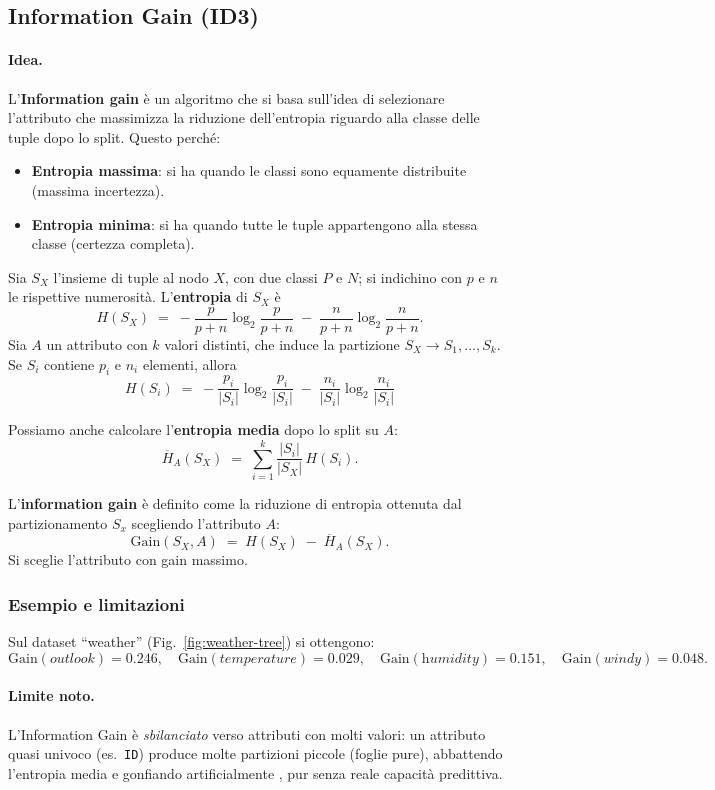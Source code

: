 \subsection{Information Gain (ID3)}\label{subsec:ig}
\paragraph{Idea.} L'\textbf{Information gain} è un algoritmo che si basa sull'idea di selezionare l'attributo che massimizza la riduzione dell'entropia riguardo alla classe delle tuple dopo lo split. Questo perché:
\begin{itemize}
  \item \textbf{Entropia massima}: si ha quando le classi sono equamente distribuite (massima incertezza).
  \item \textbf{Entropia minima}: si ha quando tutte le tuple appartengono alla stessa classe (certezza completa). 
\end{itemize}

\noindent
Sia $S_X$ l’insieme di tuple al nodo $X$, con due classi $P$ e $N$; si indichino con $p$
e $n$ le rispettive numerosità. L’\textbf{entropia} di $S_X$ è
\[
H(S_X)\;=\; -\frac{p}{p+n}\log_2\!\frac{p}{p+n}\;-\;\frac{n}{p+n}\log_2\!\frac{n}{p+n}.
\]
Sia $A$ un attributo con $k$ valori distinti, che induce la partizione
$S_X \to S_1,\dots,S_k$. Se $S_i$ contiene $p_i$ e $n_i$ elementi, allora
\[
H(S_i)\;=\; -\frac{p_i}{|S_i|}\log_2\!\frac{p_i}{|S_i|}\;-\;\frac{n_i}{|S_i|}\log_2\!\frac{n_i}{|S_i|}
\]

Possiamo anche calcolare l'\textbf{entropia media} dopo lo split su $A$:
\[
\overline{H}_A(S_X)\;=\;\sum_{i=1}^k \frac{|S_i|}{|S_X|}\,H(S_i).
\]

L’\textbf{information gain} è definito come la riduzione di entropia ottenuta dal partizionamento $S_x$ scegliendo l'attributo $A$:
\[
\mathrm{Gain}(S_X,A)\;=\;H(S_X)\;-\;\overline{H}_A(S_X).
\]
Si sceglie l’attributo con gain massimo.

\subsubsection*{Esempio e limitazioni}\label{par:ig-example}
Sul dataset “weather” (Fig.~\ref{fig:weather-tree}) si ottengono:
\[
\mathrm{Gain}(\textit{outlook})=0.246,\quad
\mathrm{Gain}(\textit{temperature})=0.029,\quad
\mathrm{Gain}(\textit{humidity})=0.151,\quad
\mathrm{Gain}(\textit{windy})=0.048.
\]

\paragraph{Limite noto.} L’Information Gain è \emph{sbilanciato} verso attributi con molti valori:
un attributo quasi univoco (es.\ \texttt{ID}) produce molte partizioni piccole (foglie pure),
abbattendo l’entropia media e gonfiando artificialmente , pur senza reale capacità
predittiva.

